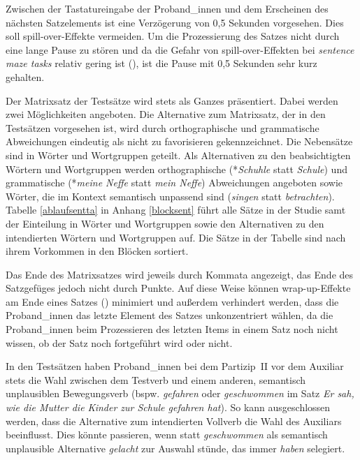 Zwischen der Tastatureingabe der Proband\_innen und dem Erscheinen des nächsten Satz\-elements ist eine Verzögerung von 0,5 Sekunden vorgesehen. Dies soll spill-over-Effekte vermeiden. Um die Prozessierung des Satzes nicht durch eine lange Pause zu stören und da die Gefahr von spill-over-Effekten bei \textit{sentence maze tasks} relativ gering ist (\cite[164]{Forster.2009}), ist die Pause mit 0,5 Sekunden sehr kurz gehalten. 

Der Matrixsatz der Testsätze wird stets als Ganzes präsentiert. Dabei werden zwei Möglichkeiten angeboten. Die Alternative zum Matrixsatz, der in den Testsätzen vorgesehen ist, wird durch orthographische und grammatische Abweichungen eindeutig als nicht zu favorisieren gekennzeichnet. Die Nebensätze sind in Wörter und Wortgruppen geteilt. Als Alternativen zu den beabsichtigten Wörtern und Wortgruppen werden orthographische (*\textit{Schuhle} statt \textit{Schule}) und grammatische (*\textit{meine Neffe} statt \textit{mein Neffe}) Abweichungen angeboten sowie Wörter, die im Kontext semantisch unpassend sind (\textit{singen} statt \textit{betrachten}). Tabelle \ref{ablaufsentta} in Anhang \ref{blocksent} führt alle Sätze in der Studie samt der Einteilung in Wörter und Wortgruppen sowie den Alternativen zu den intendierten Wörtern und Wortgruppen auf. Die Sätze in der Tabelle sind nach ihrem Vorkommen in den Blöcken sortiert. 

 
Das Ende des Matrixsatzes wird jeweils durch Kommata angezeigt, das Ende des Satzgefüges jedoch nicht durch Punkte. Auf diese Weise können wrap-up-Effekte am Ende eines Satzes (\cite{Rayner.2000}) minimiert und außerdem verhindert werden, dass die Proband\_innen das letzte Element des Satzes unkonzentriert wählen, da die Proband\_innen beim Prozessieren des letzten Items in einem Satz noch nicht wissen, ob der Satz noch fortgeführt wird oder nicht.



In den Testsätzen haben Proband\_innen bei dem Partizip~II vor dem Auxiliar stets die Wahl zwischen dem Testverb und einem anderen, semantisch unplausiblen Bewegungsverb (bspw. \textit{gefahren} oder \textit{geschwommen} im Satz \textit{Er sah, wie die Mutter die Kinder zur Schule gefahren hat}). So kann ausgeschlossen werden, dass die Alternative zum intendierten Vollverb die Wahl des  Auxiliars beeinflusst. Dies könnte passieren, wenn statt \textit{geschwommen} als semantisch unplausible Alternative \textit{gelacht} zur Auswahl stünde, das immer \textit{haben} selegiert.



